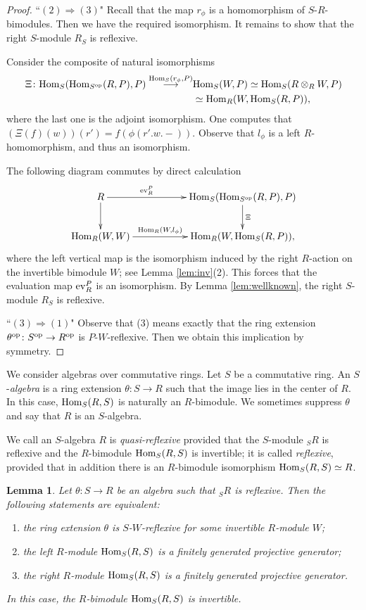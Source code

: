 \documentclass[a4paper]{amsart}
\newtheorem{lem}[thm]{Lemma}
\theoremstyle{definition}
\theoremstyle{remark}
\numberwithin{equation}{section}
\begin{document}
\begin{proof}
``$(2)\Rightarrow (3)$" Recall that the map $r_\phi$ is a homomorphism of $S$-$R$-bimodules. Then we have the required isomorphism. It remains to show that the right $S$-module $R_S$ is reflexive.

Consider the composite of natural isomorphisms
\begin{align*}
\Xi \colon {\rm Hom}_S({\rm Hom}_{S^{\rm op}}(R, P), P)\stackrel{{\rm Hom}_S(r_\phi, P)}\longrightarrow &{\rm Hom}_S(W, P) \simeq {\rm Hom}_S(R\otimes_R W, P) \\
&\simeq {\rm Hom}_R(W, {\rm Hom}_S(R, P)),
\end{align*}
where the last one is the adjoint isomorphism. One computes that $(\Xi(f)(w))(r')=f(\phi(r'.w.-))$. Observe that $l_\phi$ is a left $R$-homomorphism, and thus an isomorphism.

The following diagram commutes by direct calculation
\[\xymatrix{
R\ar[d] \ar[rr]^-{{\rm ev}_R^P} && {\rm Hom}_S({\rm Hom}_{S^{\rm op}}(R, P), P) \ar[d]^-{\Xi}\\
{\rm Hom}_R(W, W) \ar[rr]^-{{\rm Hom}_R(W, l_\phi)} && {\rm Hom}_R(W, {\rm Hom}_S(R, P)), }\]
where the left vertical map is the isomorphism induced by the right $R$-action on the invertible bimodule $W$; see Lemma \ref{lem:inv}(2). This forces that
the evaluation map ${\rm ev}_R^P$ is an isomorphism. By Lemma \ref{lem:wellknown},  the right $S$-module $R_S$ is reflexive.

``$(3)\Rightarrow (1)$" Observe that (3) means exactly that the ring extension $\theta^{\rm op} \colon S^{\rm op}\rightarrow R^{\rm op}$ is $P$-$W$-reflexive. Then we obtain this implication by symmetry.
\end{proof}

We consider algebras over commutative rings. Let $S$ be a commutative ring. An $S$-\emph{algebra} is a ring extension
$\theta\colon S\rightarrow R$ such that the image lies in the center of $R$. In this case, ${\rm Hom}_S(R, S)$ is naturally an $R$-bimodule. We sometimes suppress $\theta$ and say that $R$ is an $S$-algebra.

We call an $S$-algebra $R$ is \emph{quasi-reflexive} provided that the $S$-module $_SR$ is reflexive and the $R$-bimodule ${\rm Hom}_S(R, S)$ is invertible; it is called \emph{reflexive}, provided that in addition there is an $R$-bimodule isomorphism ${\rm Hom}_S(R, S)\simeq R$.

\begin{lem}\label{lem:algebra}
Let $\theta\colon S\rightarrow R$ be an algebra such that $_SR$ is reflexive. Then the following statements are equivalent:
\begin{enumerate}
\item the ring extension $\theta$ is $S$-$W$-reflexive for some invertible $R$-module $W$;
\item the left $R$-module ${\rm Hom}_S(R, S)$ is a finitely generated projective generator;
\item the right $R$-module ${\rm Hom}_S(R, S)$ is a finitely generated projective generator.
\end{enumerate}
In this case, the $R$-bimodule ${\rm Hom}_S(R, S)$ is invertible.
\end{lem}
\end{document}
